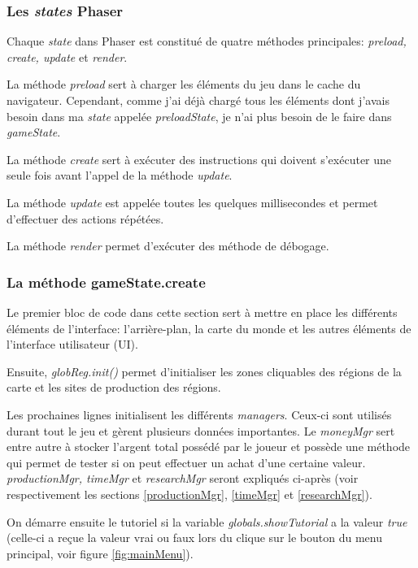 \documentclass{article}
\begin{document}
		\subsubsection{Les \textit{states} Phaser}
		Chaque \textit{state} dans Phaser est constitué de quatre méthodes principales: \textit{preload, create, update} et \textit{render}. 
		
		
		La méthode \textit{preload} sert à charger les éléments du jeu dans le cache du navigateur. Cependant, comme j'ai déjà chargé tous les éléments dont j'avais besoin dans ma \textit{state} appelée \textit{preloadState}, je n'ai plus besoin de le faire dans \textit{gameState}.  
		
		
		La méthode \textit{create} sert à exécuter des instructions qui doivent s'exécuter une seule fois avant l'appel de la méthode \textit{update}.
		
		
		La méthode \textit{update} est appelée toutes les quelques millisecondes et permet d'effectuer des actions répétées.
		
		
		La méthode \textit{render} permet d'exécuter des méthode de débogage.
		
		\subsubsection{La méthode gameState.create}
		Le premier bloc de code dans cette section sert à mettre en place les différents éléments de l'interface: l'arrière-plan, la carte du monde et les autres éléments de l'interface utilisateur (UI).
		
		
		Ensuite, \textit{globReg.init()} permet d'initialiser les zones cliquables des régions de la carte et les sites de production des régions.
		
		
		Les prochaines lignes initialisent les différents \textit{managers}. Ceux-ci sont utilisés durant tout le jeu et gèrent plusieurs données importantes. Le \textit{moneyMgr} sert entre autre à stocker l'argent total possédé par le joueur et possède une méthode qui permet de tester si on peut effectuer un achat d'une certaine valeur. \textit{productionMgr, timeMgr} et \textit{researchMgr} seront expliqués ci-après (voir respectivement les sections \ref{productionMgr}, \ref{timeMgr} et \ref{researchMgr}).
		
		
		On démarre ensuite le tutoriel si la variable \textit{globals.showTutorial} a la valeur \textit{true} (celle-ci a reçue la valeur vrai ou faux lors du clique sur le bouton du menu principal, voir figure \ref{fig:mainMenu}).
		
\end{document}
